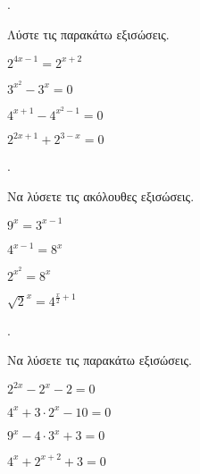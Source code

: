 \documentclass[11pt,a4paper,twocolumn]{article}
\newcounter{askhsh}
\newcommand{\askhsh}{\large\theaskhsh.\ \addtocounter{askhsh}{1}}
\begin{document}
\askhsh Λύστε τις παρακάτω εξισώσεις.
\begin{multicols}{2}
\begin{alist}
\item $2^{4x-1}=2^{x+2}$
\item $3^{x^2}-3^x=0$
\item $4^{x+1}-4^{x^2-1}=0$
\item $2^{2x+1}+2^{3-x}=0$
\end{alist}
\end{multicols}
\askhsh Να λύσετε τις ακόλουθες εξισώσεις.
\begin{multicols}{2}
\begin{alist}
\item $9^x=3^{x-1}$
\item $4^{x-1}=8^x$
\item $2^{x^2}=8^x$
\item $\sqrt{2}^x=4^{\frac{x}{2}+1}$
\end{alist}
\end{multicols}
\askhsh Να λύσετε τις παρακάτω εξισώσεις.
\begin{alist}
\item $2^{2x}-2^x-2=0$
\item $4^{x}+3\cdot 2^{x}-10=0$
\item $9^{x}-4\cdot 3^x+3=0$
\item $4^x+2^{x+2}+3=0$
\end{alist}
\end{document}
